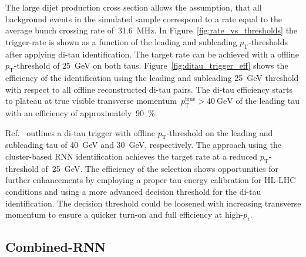 The large dijet production cross section allows the assumption, that all
background events in the simulated sample correspond to a rate equal to the
average bunch crossing rate of~\SI{31.6}{\mega\hertz}. In
Figure~\ref{fig:rate_vs_thresholds} the trigger-rate is shown as a function of
the leading and subleading $p_\text{T}$-thresholds after applying di-tau
identification. The target rate can be achieved with a offline
$p_\text{T}$-threshold of \SI{25}{\GeV} on both taus.
Figure~\ref{fig:ditau_trigger_eff} shows the efficiency of the identification
using the leading and subleading \SI{25}{\GeV} threshold with respect to all
offline reconstructed di-tau pairs. The di-tau efficiency starts to plateau at
true visible transverse momentum~$p_\text{T}^\text{true} > \SI{40}{\GeV}$ of the
leading tau with an efficiency of approximately~\SI{90}{\percent}.

Ref.~\cite{phase_2_scoping} outlines a di-tau trigger with offline
$p_\text{T}$-threshold on the leading and subleading tau of \SI{40}{\GeV} and
\SI{30}{\GeV}, respectively. The approach using the cluster-based RNN
identification achieves the target rate at a reduced $p_\text{T}$-threshold
of~\SI{25}{\GeV}. The efficiency of the selection shows opportunities for
further enhancements by employing a proper tau energy calibration for HL-LHC
conditions and using a more advanced decision threshold for the di-tau
identification. The decision threshold could be loosened with increasing
transverse momentum to ensure a quicker turn-on and full efficiency at
high-$p_\text{t}$.

\subsection{Combined-RNN}
\label{sec:rnn_combined}

